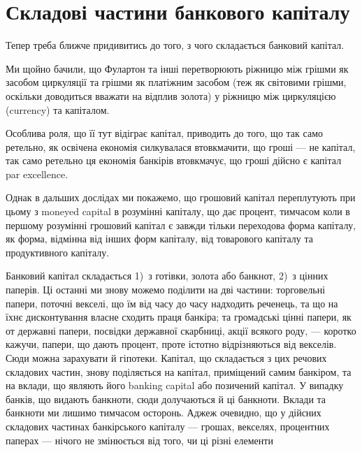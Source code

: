 


\section{Складові частини банкового капіталу}

Тепер треба ближче придивитись до того, з чого складається банковий
капітал.

Ми щойно бачили, що Фулартон та інші перетворюють ріжницю між грішми
як засобом циркуляції та грішми як платіжним засобом (теж як світовими
грішми, оскільки доводиться вважати на відплив золота) у ріжницю між циркуляцією
(currency) та капіталом.

Особлива роля, що її тут відіграє капітал, приводить до того, що так само
ретельно, як освічена економія силкувалася втовкмачити, що гроші — не капітал,
так само ретельно ця економія банкірів втовкмачує, що гроші дійсно є капітал
par excellence.

Однак в дальших дослідах ми покажемо, що грошовий капітал переплутують
при цьому з moneyed capital в розумінні капіталу, що дає процент,
тимчасом коли в першому розумінні грошовий капітал є завжди тільки переходова
форма капіталу, як форма, відмінна від інших форм капіталу, від
товарового капіталу та продуктивного капіталу.

Банковий капітал складається 1)~з готівки, золота або банкнот, 2)~з
цінних паперів. Ці останні ми знову можемо поділити на дві частини: торговельні
папери, поточні векселі, що їм від часу до часу надходить реченець, та
що на їхнє дисконтування власне сходить праця банкіра; та громадські
цінні папери, як от державні папери, посвідки державної скарбниці, акції
всякого роду, — коротко кажучи, папери, що дають процент, проте істотно відрізняються
від векселів. Сюди можна зарахувати й гіпотеки. Капітал, що складається
з цих речових складових частин, знову поділяється на капітал, приміщений
самим банкіром, та на вклади, що являють його banking capital або
позичений капітал. У випадку банків, що видають банкноти, сюди долучаються й ці
банкноти. Вклади та банкноти ми лишимо тимчасом осторонь. Аджеж очевидно,
що у дійсних складових частинах банкірського капіталу — грошах, векселях,
процентних паперах — нічого не змінюється від того, чи ці різні елементи
\parbreak{}  %
